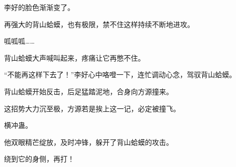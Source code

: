 \begin{this_body}
李好的脸色渐渐变了。

再强大的背山蛤蟆，也有极限，禁不住这样持续不断地进攻。

呱呱呱……

背山蛤蟆大声喊叫起来，疼痛让它再憋不住。

“不能再这样下去了！”李好心中咯噔一下，连忙调动心念，驾驭背山蛤蟆。

背山蛤蟆开始反击，后足猛踏泥地，合身向方源撞来。

这招势大力沉至极，方源若是挨上这一记，必定被撞飞。

横冲蛊。

他双眼精芒绽放，及时冲锋，躲开了背山蛤蟆的攻击。

绕到它的身侧，再打！

\end{this_body}

